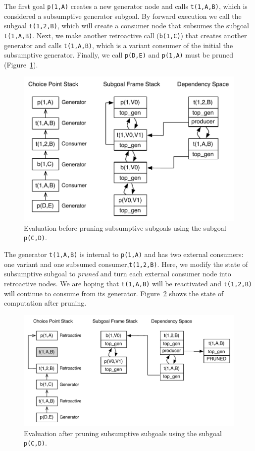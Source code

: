 The first goal \texttt{p(1,A)}
creates a new generator node and calls \texttt{t(1,A,B)}, which is considered a subsumptive generator subgoal.
By forward execution we call the subgoal \texttt{t(1,2,B)}, which will create a consumer node that subsumes
the subgoal \texttt{t(1,A,B)}. Next, we make another retroactive call (\texttt{b(1,C)}) that creates
another generator and calls \texttt{t(1,A,B)}, which is a variant consumer of the initial the subsumptive generator.
Finally, we call \texttt{p(D,E)} and \texttt{p(1,A)} must be pruned (Figure~\ref{fig:retro_sub1}).

\begin{figure}[ht]
  \centering
    \includegraphics[scale=0.5]{retro_sub1.pdf}
  \caption{Evaluation before pruning subsumptive subgoals using the subgoal \texttt{p(C,D)}.}
  \label{fig:retro_sub1}
\end{figure}

The generator \texttt{t(1,A,B)} is internal to \texttt{p(1,A)} and has two external consumers: one variant
and one subsumed consumer,\texttt{t(1,2,B)}. Here, we modify the state of subsumptive subgoal to \textit{pruned}
and turn each external consumer node into retroactive nodes. We are hoping that \texttt{t(1,A,B)} will be
reactivated and \texttt{t(1,2,B)} will continue to consume from its generator. Figure~\ref{fig:retro_sub2}
shows the state of computation after pruning.

\begin{figure}[ht]
  \centering
    \includegraphics[scale=0.5]{retro_sub2.pdf}
  \caption{Evaluation after pruning subsumptive subgoals using the subgoal \texttt{p(C,D)}.}
  \label{fig:retro_sub2}
\end{figure}

